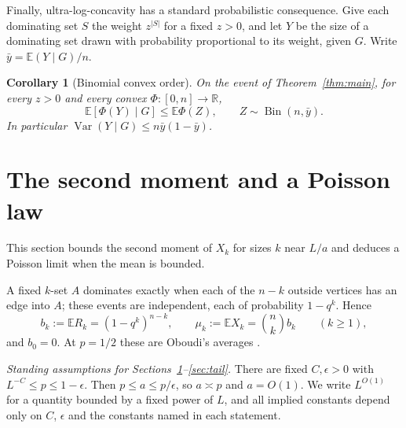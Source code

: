 \documentclass[11pt]{article}
\newtheorem{corollary}[theorem]{Corollary}
\theoremstyle{remark}
\newcommand{\E}{\mathbb E}
\newcommand{\Var}{\operatorname{Var}}
\begin{document}
Finally, ultra-log-concavity has a standard probabilistic consequence. Give each dominating set $S$ the weight $z^{|S|}$ for a fixed $z>0$, and let $Y$ be the size of a dominating set drawn with probability proportional to its weight, given $G$. Write $\bar y=\E(Y\mid G)/n$.
\begin{corollary}[Binomial convex order]\label{cor:convex}
On the event of Theorem~\ref{thm:main}, for every $z>0$ and every convex $\Phi\colon[0,n]\to\mathbb R$,
\[
 \E[\Phi(Y)\mid G]\le\E\Phi(Z),\qquad Z\sim\operatorname{Bin}(n,\bar y).
\]
In particular $\Var(Y\mid G)\le n\bar y(1-\bar y)$.
\end{corollary}

\section{The second moment and a Poisson law}\label{sec:pairs}
This section bounds the second moment of $X_k$ for sizes $k$ near $L/a$ and deduces a Poisson limit when the mean is bounded.

A fixed $k$-set $A$ dominates exactly when each of the $n-k$ outside vertices has an edge into $A$; these events are independent, each of probability $1-q^k$. Hence
\begin{equation}
 b_k:=\E R_k=(1-q^k)^{n-k},\qquad \mu_k:=\E X_k=\binom nk b_k\qquad(k\ge1),
 \label{eq:mean}
\end{equation}
and $b_0=0$. At $p=1/2$ these are Oboudi's averages \cite[Theorem~2.1]{Oboudi}.

\emph{Standing assumptions for Sections~\ref{sec:pairs}--\ref{sec:tail}.} There are fixed $C,\epsilon>0$ with $L^{-C}\le p\le1-\epsilon$. Then $p\le a\le p/\epsilon$, so $a\asymp p$ and $a=O(1)$. We write $L^{O(1)}$ for a quantity bounded by a fixed power of $L$, and all implied constants depend only on $C$, $\epsilon$ and the constants named in each statement.
\end{document}
